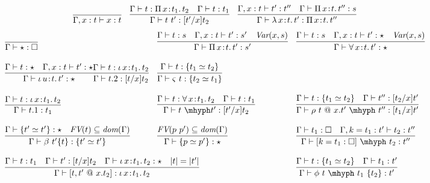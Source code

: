\documentclass{article}
\newcommand{\abs}[4]{{#1}\, #2\! : \! #3.\, #4}
\begin{document}
\begin{figure}
  {
    \[
    \begin{array}{lll}
    \infer{\Gamma, x : t \vdash x : t}{\ } &
    \infer{\Gamma\vdash t\ t' : [t'/x]t_2}{\Gamma\vdash t : \abs{\Pi}{x}{t_1}{t_2} & \Gamma\vdash t : t_1} &
    \infer{\Gamma\vdash\abs{\lambda}{x}{t}{t'} : \abs{\Pi}{x}{t}{t''}}{\Gamma,x:t\vdash t':t'' \quad \Gamma \vdash \abs{\Pi}{x}{t}{t''} : s}   
    \end{array}
    \]
    }
{
  \[
  \begin{array}{lll}
    \infer{\Gamma\vdash \star : \Box}{\ } &
    \infer{\Gamma\vdash\abs{\Pi}{x}{t}{t'} : s'}{\Gamma \vdash t : s \quad \Gamma,x:t\vdash t' : s' \quad \textit{Var}(x,s)} &
    \infer{\Gamma\vdash\abs{\forall}{x}{t}{t'} : \star}{\Gamma \vdash t : s \quad \Gamma,x:t\vdash t' : \star \quad \textit{Var}(x,s)} 
    \\ \\
    \infer{\Gamma\vdash\abs{\iota}{u}{t}{t'} : \star}{\Gamma \vdash t : \star \quad \Gamma,x:t\vdash t' : \star} 
   \infer{\Gamma\vdash t.2 : [t/x]t_2}{\Gamma\vdash t : \abs{\iota}{x}{t_1}{t_2}} &    
    \infer{\Gamma\vdash \varsigma\ t : \{ t_2 \simeq t_1\}}{\Gamma\vdash t : \{t_1 \simeq t_2\}}

\\ \\
    \infer{\Gamma\vdash t.1 : t_1}{\Gamma\vdash t : \abs{\iota}{x}{t_1}{t_2}} &
    \infer{\Gamma\vdash t\ \mhyph t' : [t'/x]t_2}{\Gamma\vdash t : \abs{\forall}{x}{t_1}{t_2} & \Gamma\vdash t : t_1} &
    \infer{\Gamma\vdash \rho\ t\ @\ x.t'\ \mhyph\ t'' : [t_1/x]t'}{\Gamma \vdash t : \{ t_1 \simeq t_2 \} \quad \Gamma\vdash t'' : [t_2/x]t'}
    \\ \\
    \infer{\Gamma\vdash \beta\ t'\{t\} : \{ t' \simeq t'\}}{\Gamma\vdash \{ t' \simeq t' \} : \star & \textit{FV}(t)\subseteq \textit{dom}(\Gamma)} &
    \infer{\Gamma\vdash \{ p \simeq p'\} : \star}{\textit{FV}(p\ p')\subseteq \textit{dom}(\Gamma)} &
     \infer{\Gamma\vdash [ k = t_1 : \Box ]\ \mhyph\ t_2 : t''}{\Gamma\vdash t_1 : \Box \quad
                                                               \Gamma, k = t_1 : t' \vdash t_2 : t''}  
    \\ \\
    \multicolumn{2}{l}{
    \infer{\Gamma\vdash [t,t'\ @\ x.t_2] : \abs{\iota}{x}{t_1}{t_2}}{\Gamma\vdash t : t_1 \quad \Gamma\vdash t' : [t/x]t_2 \quad \Gamma \vdash \abs{\iota}{x}{t_1}{t_2} : \star \quad |t| = |t'|}} &  
  \infer{\Gamma\vdash \phi\ t\ \mhyph\ t_1\ \{t_2\} : t'}{\Gamma \vdash t : \{t_1 \simeq t_2\} \quad \Gamma\vdash t_1 : t'}  
    \\ \\


\end{array}\]}
\end{figure}
\end{document}
